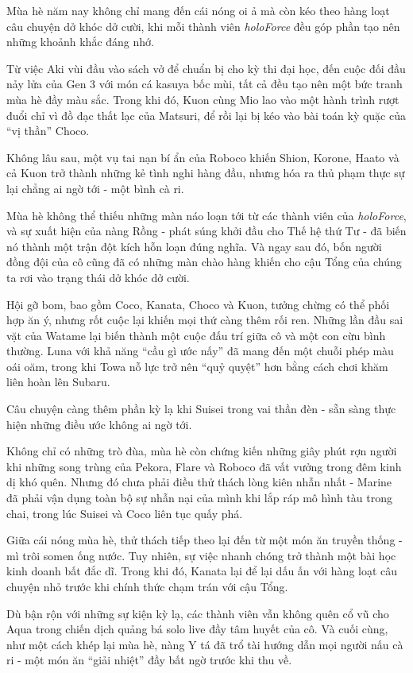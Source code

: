 \documentclass[main.tex]{subfiles}
\begin{document}
Mùa hè năm nay không chỉ mang đến cái nóng oi ả mà còn kéo theo hàng loạt câu chuyện dở khóc dở cười, khi mỗi thành viên \textit{holoForce} đều góp phần tạo nên những khoảnh khắc đáng nhớ. 

Từ việc Aki vùi đầu vào sách vở để chuẩn bị cho kỳ thi đại học, đến cuộc đối đầu nảy lửa của Gen 3 với món cá kasuya bốc mùi, tất cả đều tạo nên một bức tranh mùa hè đầy màu sắc. Trong khi đó, Kuon cùng Mio lao vào một hành trình rượt đuổi chỉ vì đồ đạc thất lạc của Matsuri, để rồi lại bị kéo vào bài toán kỳ quặc của ``vị thần'' Choco. 

Không lâu sau, một vụ tai nạn bí ẩn của Roboco khiến Shion, Korone, Haato và cả Kuon trở thành những kẻ tình nghi hàng đầu, nhưng hóa ra thủ phạm thực sự lại chẳng ai ngờ tới - một bình cà ri.

Mùa hè không thể thiếu những màn náo loạn tới từ các thành viên của \textit{holoForce}, và sự xuất hiện của nàng Rồng - phát súng khởi đầu cho Thế hệ thứ Tư - đã biến nó thành một trận đột kích hỗn loạn đúng nghĩa. Và ngay sau đó, bốn người đồng đội của cô cũng đã có những màn chào hàng khiến cho cậu Tổng của chúng ta rơi vào trạng thái dở khóc dở cười.

Hội gỡ bom, bao gồm Coco, Kanata, Choco và Kuon, tưởng chừng có thể phối hợp ăn ý, nhưng rốt cuộc lại khiến mọi thứ càng thêm rối ren. Những lần đầu sai vặt của Watame lại biến thành một cuộc đấu trí giữa cô và một con cừu bình thường. Luna với khả năng ``cầu gì ước nấy'' đã mang đến một chuỗi phép màu oái oăm, trong khi Towa nỗ lực trở nên ``quỷ quyệt'' hơn bằng cách chơi khăm liên hoàn lên Subaru. 

Câu chuyện càng thêm phần kỳ lạ khi Suisei trong vai thần đèn - sẵn sàng thực hiện những điều ước không ai ngờ tới.

Không chỉ có những trò đùa, mùa hè còn chứng kiến những giây phút rợn người khi những song trùng của Pekora, Flare và Roboco đã vất vưởng trong đêm kinh dị khó quên. Nhưng đó chưa phải điều thử thách lòng kiên nhẫn nhất - Marine đã phải vận dụng toàn bộ sự nhẫn nại của mình khi lắp ráp mô hình tàu trong chai, trong lúc Suisei và Coco liên tục quấy phá. 

Giữa cái nóng mùa hè, thử thách tiếp theo lại đến từ một món ăn truyền thống - mì trôi somen ống nước. Tuy nhiên, sự việc nhanh chóng trở thành một bài học kinh doanh bất đắc dĩ. Trong khi đó, Kanata lại để lại dấu ấn với hàng loạt câu chuyện nhỏ trước khi chính thức chạm trán với cậu Tổng.

Dù bận rộn với những sự kiện kỳ lạ, các thành viên vẫn không quên cổ vũ cho Aqua trong chiến dịch quảng bá solo live đầy tâm huyết của cô. Và cuối cùng, như một cách khép lại mùa hè, nàng Y tá đã trổ tài hướng dẫn mọi người nấu cà ri - một món ăn ``giải nhiệt'' đầy bất ngờ trước khi thu về.
\end{document}
